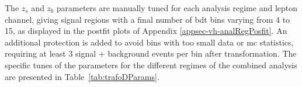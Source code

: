 The $z_s$ and $z_b$ parameters are manually tuned for each analysis regime and lepton channel, giving signal regions with a final number of \gls{bdt} bins varying from 4 to 15, as displayed in the postfit plots of Appendix \ref{appsec-vh-analRegPosfit}. An additional protection is added to avoid bins with too small data or \gls{mc} statistics, requiring at least 3 signal + background events per bin after transformation. The specific tunes of the parameters for the different regimes of the combined analysis are presented in Table~\ref{tab:trafoDParams}.
